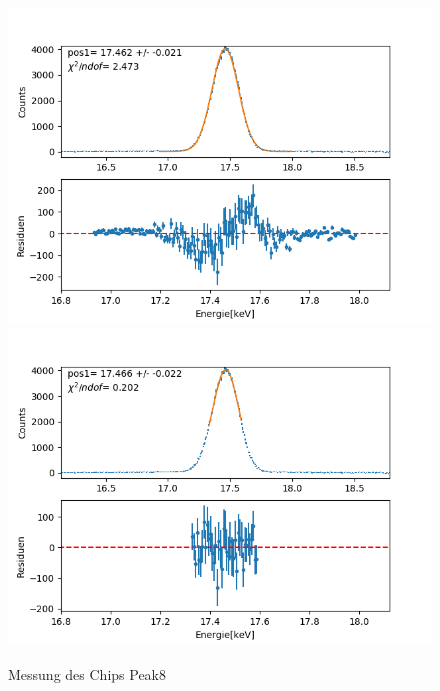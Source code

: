 \documentclass[12pt,a4paper]{article}
\begin{document}
\begin{figure}[H]
\centering
\includegraphics[scale=0.49]{Bilder/roentgen_spektren/chip/chip8_1.png}
\includegraphics[scale=0.49]{Bilder/roentgen_spektren/chip/chip8_2.png}
\caption{Messung des Chips Peak8}
\end{figure}
\end{document}
